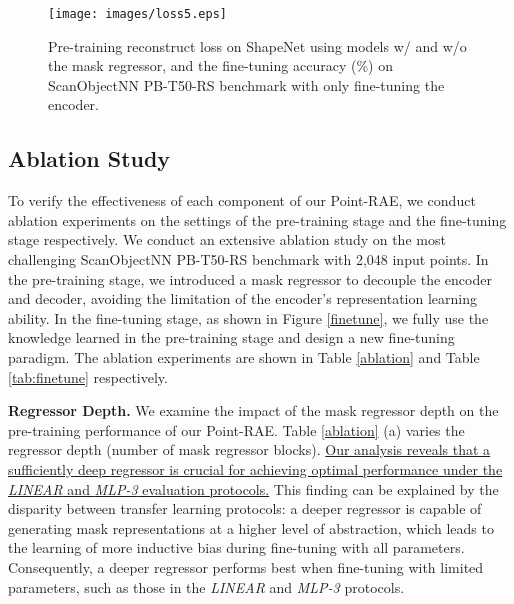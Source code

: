 \documentclass[sigconf, screen]{acmart}
\begin{document}
\begin{figure}[t]
  \centering
\texttt{[image: images/loss5.eps]}
\caption{Pre-training reconstruct loss on ShapeNet using models w/ and w/o the mask regressor, and the fine-tuning accuracy (\%) on ScanObjectNN PB-T50-RS benchmark with only fine-tuning the encoder.
  }
  \label{loss}
\end{figure}
\subsection{Ablation Study}
\label{lab:abaltion}


To verify the effectiveness of each component of our Point-RAE, we conduct ablation experiments on the settings of the pre-training stage and the fine-tuning stage respectively. We conduct an extensive ablation study on the most challenging ScanObjectNN PB-T50-RS benchmark with 2,048 input points.
In the pre-training stage, we introduced a mask regressor to decouple the encoder and decoder, avoiding the limitation of the encoder's representation learning ability. 
In the fine-tuning stage, as shown in Figure \ref{finetune}, we fully use the knowledge learned in the pre-training stage and design a new fine-tuning paradigm. 
The ablation experiments are shown in Table \ref{ablation} and Table \ref{tab:finetune} respectively.

\noindent \textbf{Regressor Depth.} 
We examine the impact of the mask regressor depth on the pre-training performance of our Point-RAE.
Table \ref{ablation} (a) varies the regressor depth (number of mask regressor blocks). 
\uline{Our analysis reveals that a sufficiently deep regressor is crucial for achieving optimal performance under the \textit{LINEAR} and \textit{MLP-3} evaluation protocols.} This finding can be explained by the disparity between transfer learning protocols: a deeper regressor is capable of generating mask representations at a higher level of abstraction, which leads to the learning of more inductive bias during fine-tuning with all parameters. Consequently, a deeper regressor performs best when fine-tuning with limited parameters, such as those in the \textit{LINEAR} and \textit{MLP-3} protocols.
\end{document}
